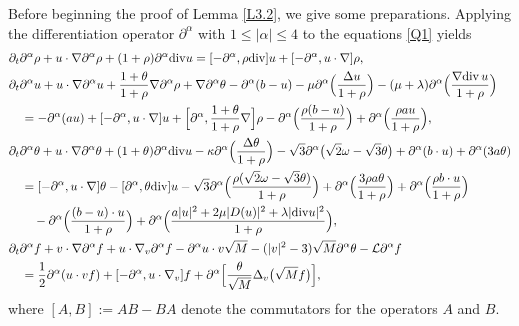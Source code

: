 \documentclass[reqno,11pt]{amsart}
\theoremstyle{plain}
\numberwithin{equation}{section}
\begin{document}
Before beginning the proof of Lemma \ref{L3.2}, we give some preparations. 
Applying the differentiation operator $\partial^\alpha$ with $1\leq |\alpha|\leq 4$ to the equations \eqref{Q1}  yields
\begin{align}\label{LNXG3.13}
& \partial_t  \partial^\alpha \rho  +u \cdot \nabla \partial^\alpha \rho+(1+\rho) \partial^\alpha {\rm div}   u=[-\partial^\alpha, \rho {\rm div}  ] u+ [-\partial^\alpha, u \cdot \nabla   ] \rho ,\\ \label{LNXG3.14}
& \partial_t  \partial^\alpha u  +u \cdot \nabla  \partial^\alpha u +\frac{1+\theta}{1+\rho}\nabla\partial^\alpha\rho+\nabla  \partial^\alpha \theta-\partial^\alpha(b-u) -\mu\partial^\alpha\Big(\frac{\Delta u}{1+\rho}\Big) -(\mu+\lambda)\partial^\alpha \Big(\frac{\nabla{\rm div}\, u}{1+\rho}\Big) \nonumber \\
&\quad = -\partial^\alpha(au)+[-\partial^\alpha, u \cdot \nabla] u+ \Big[\partial^\alpha,  \frac{1+\theta}{1+\rho}\nabla\Big] \rho-\partial^\alpha\Big ( \frac{\rho(b-u)}{1+\rho} \Big)  +\partial^\alpha \Big(  \frac{\rho  au}{1+\rho}  \Big), \\
\label{LNXG3.15}
& \partial_t\partial^\alpha \theta+ u\cdot\nabla\partial^\alpha \theta+(1+\theta ) \partial^\alpha{\rm div}u-\kappa\partial^\alpha \Big( \frac{\Delta \theta}{1+\rho}\Big)-\sqrt{3}\partial^\alpha\big(\sqrt{2}\omega-\sqrt{3}\theta  \big)  +\partial^\alpha(b\cdot u)+\partial^\alpha(3a\theta)\nonumber\\
&\quad=[-\partial^\alpha, u\cdot\nabla]\theta-[\partial^\alpha, \theta{\rm div}]u -\sqrt{3}\partial^\alpha\Big( \frac{\rho(\sqrt{2}\omega-\sqrt{3}\theta)}{1+\rho}  \Big)+\partial^\alpha\Big(  \frac{3\rho a\theta}{1+\rho} \Big)+\partial^\alpha\Big(  \frac{\rho b\cdot u}{1+\rho} \Big)\nonumber\\
&\quad\quad-\partial^\alpha \Big( \frac{(b-u)\cdot u}{1+\rho}  \Big)+\partial^\alpha\Big(\frac{a|u|^2+2\mu |D(u)|^2+\lambda |{\rm div}u|^2}{1+\rho}\Big), \\\label{LNXG3.16}
&\partial_t \partial^\alpha f +v \cdot \nabla \partial^\alpha f +u \cdot \nabla_v \partial^\alpha f -\partial^\alpha u \cdot v \sqrt{M}- (|v|^2-3)  \sqrt{M} \partial^\alpha \theta-\mathcal{L} \partial^\alpha f\nonumber \\
 &\quad =\frac{1}{2} \partial^\alpha(u \cdot v f)+ [-\partial^\alpha, u \cdot \nabla_v ] f+\partial^\alpha\Big[\frac{\theta}{\sqrt{M}}    \Delta_v\big(\sqrt{M} f\big)\Big],  
\end{align}
where $[A,B]:=AB - BA$ denote the commutators for the   operators $A$ and $B$. 
\end{document}
